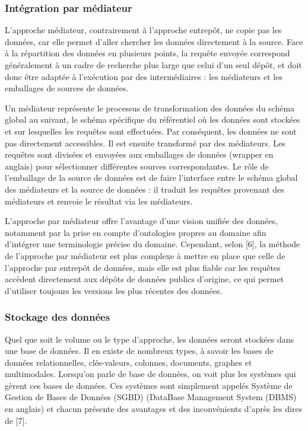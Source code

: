 \documentclass{article}
\begin{document}
	\subsubsection{Intégration par médiateur}
	L’approche médiateur, contrairement à l’approche entrepôt, ne copie pas les données, car elle permet d’aller chercher les données directement à la source. Face à la répartition des données en plusieurs points, la requête envoyée correspond généralement à un cadre de recherche plus large que celui d’un seul dépôt, et doit donc être adaptée à l’exécution par des intermédiaires : les médiateurs et les emballages de sources de données.
	
	Un médiateur représente le processus de transformation des données du schéma global au suivant, le schéma spécifique du référentiel où les données sont stockées et sur lesquelles les requêtes sont effectuées. Par conséquent, les données ne sont pas directement accessibles. Il est ensuite transformé par des médiateurs. Les requêtes sont divisées et envoyées aux emballages de données (wrapper en anglais) pour sélectionner différentes sources correspondantes. Le rôle de l’emballage de la source de données est de faire l’interface entre le schéma global des médiateurs et la source de données : il traduit les requêtes provenant des médiateurs et renvoie le résultat via les médiateurs.
	
	
	
	L’approche par médiateur offre l’avantage d’une vision unifiée des données, notamment par la prise en compte d’ontologies propres au domaine afin d’intégrer une terminologie précise du domaine. Cependant, selon [6], la méthode de l’approche par médiateur est plus complexe à mettre en place que celle de l’approche par entrepôt de données, mais elle est plus fiable car les requêtes accèdent directement aux dépôts de données publics d’origine, ce qui permet d’utiliser toujours les versions les plus récentes des données.
	
	\subsubsection{Stockage des données}
	Quel que soit le volume ou le type d’approche, les données seront stockées dans une base de données. Il en existe de nombreux types, à savoir les bases de données relationnelles, clés-valeurs, colonnes, documents, graphes et multimodales. Lorsqu’on parle de base de données, on voit plus les systèmes qui gèrent ces bases de données. Ces systèmes sont simplement appelés Système de Gestion de Bases de Données (SGBD) (DataBase Management System (DBMS) en anglais) et chacun présente des avantages et des inconvénients d’après les dires de [7].
	
\end{document}
